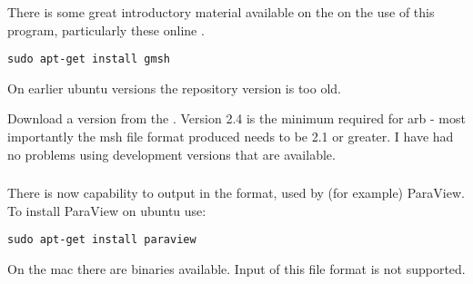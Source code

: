 There is some great introductory material available on the  on the use of this program, particularly these online .


\begin{verbatim}
sudo apt-get install gmsh
\end{verbatim}

On earlier ubuntu versions the repository version is too old.


Download a version from the .  Version 2.4 is the minimum required for arb - most importantly the msh file format produced needs to be 2.1 or greater.  I have had no problems using development versions that are available.



\subsubsection{ \label{sec:paraview}}

There is now capability to output in the  format, used by (for example) ParaView.  To install ParaView on ubuntu use:
%
\begin{verbatim}
sudo apt-get install paraview
\end{verbatim}
%
On the mac there are binaries available.  Input of this file format is not supported.

